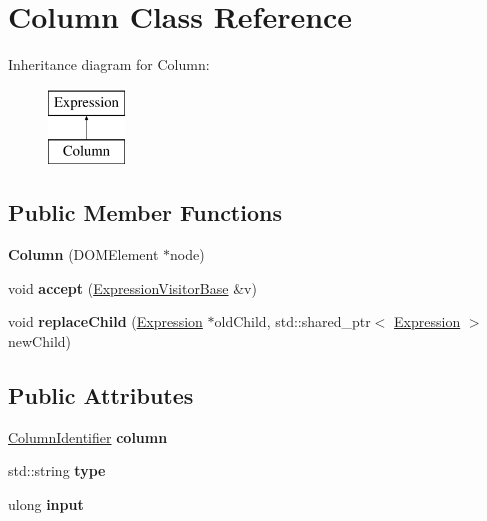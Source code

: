 \hypertarget{class_column}{\section{Column Class Reference}
\label{class_column}
}
Inheritance diagram for Column\+:\begin{figure}[H]
\begin{center}
\leavevmode
\includegraphics[height=2.000000cm]{class_column}
\end{center}
\end{figure}
\subsection*{Public Member Functions}
\begin{DoxyCompactItemize}
\item 
\hypertarget{class_column_a9934481a60fd2373bfe7ced5f208b505}{{\bfseries Column} (D\+O\+M\+Element $\ast$node)}\label{class_column_a9934481a60fd2373bfe7ced5f208b505}

\item 
\hypertarget{class_column_a6e925985b1e87ed92795d318c52e5470}{void {\bfseries accept} (\hyperlink{class_expression_visitor_base}{Expression\+Visitor\+Base} \&v)}\label{class_column_a6e925985b1e87ed92795d318c52e5470}

\item 
\hypertarget{class_column_af1571fb51f887aeb1dcf7ff44382a72b}{void {\bfseries replace\+Child} (\hyperlink{class_expression}{Expression} $\ast$old\+Child, std\+::shared\+\_\+ptr$<$ \hyperlink{class_expression}{Expression} $>$ new\+Child)}\label{class_column_af1571fb51f887aeb1dcf7ff44382a72b}

\end{DoxyCompactItemize}
\subsection*{Public Attributes}
\begin{DoxyCompactItemize}
\item 
\hypertarget{class_column_a22e87a2e1f67da45c085a9898156e31c}{\hyperlink{class_column_identifier}{Column\+Identifier} {\bfseries column}}\label{class_column_a22e87a2e1f67da45c085a9898156e31c}

\item 
\hypertarget{class_column_a18cd6b6f12a338f6e08c36da7fadb7ec}{std\+::string {\bfseries type}}\label{class_column_a18cd6b6f12a338f6e08c36da7fadb7ec}

\item 
\hypertarget{class_column_addd3816c69df05b9f717348dca79ee21}{ulong {\bfseries input}}\label{class_column_addd3816c69df05b9f717348dca79ee21}

\end{DoxyCompactItemize}
